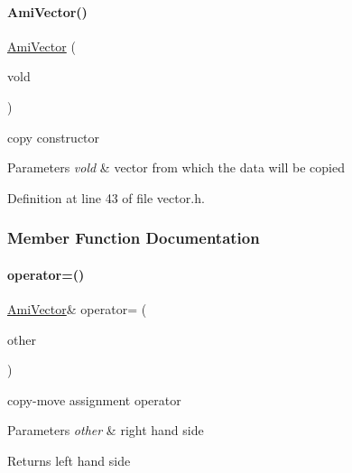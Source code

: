 \paragraph{\texorpdfstring{Ami\+Vector()}{AmiVector()}\hspace{0.1cm}{\footnotesize\ttfamily [3/3]}}
{\footnotesize\ttfamily \mbox{\hyperlink{classamici_1_1_ami_vector}{Ami\+Vector}} (\begin{DoxyParamCaption}\item[{const \mbox{\hyperlink{classamici_1_1_ami_vector}{Ami\+Vector}} \&}]{vold }\end{DoxyParamCaption})}

copy constructor 
\begin{DoxyParams}{Parameters}
{\em vold} & vector from which the data will be copied \\
\hline
\end{DoxyParams}


Definition at line 43 of file vector.\+h.



\subsubsection{Member Function Documentation}
\mbox{\label{classamici_1_1_ami_vector_a6e52c4d61a7ea2d5bfb2f797aa8041ec}} 
\paragraph{\texorpdfstring{operator=()}{operator=()}}
{\footnotesize\ttfamily \mbox{\hyperlink{classamici_1_1_ami_vector}{Ami\+Vector}}\& operator= (\begin{DoxyParamCaption}\item[{\mbox{\hyperlink{classamici_1_1_ami_vector}{Ami\+Vector}} const \&}]{other }\end{DoxyParamCaption})}

copy-\/move assignment operator 
\begin{DoxyParams}{Parameters}
{\em other} & right hand side \\
\hline
\end{DoxyParams}
\begin{DoxyReturn}{Returns}
left hand side 
\end{DoxyReturn}


